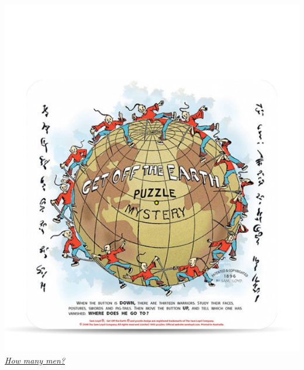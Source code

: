 \begin{frame}
\begin{textblock}{10}
{\begin{center}
\includegraphics[scale=0.5]{image/goeclean2.png}\\
{\em \underline{How many men?}}
\end{center}
}%
\end{textblock}
\end{frame}
